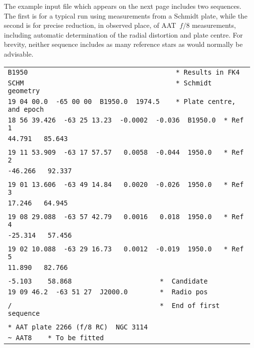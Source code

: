 The example input file which appears on the next page
includes two sequences.
The first is for a typical
run using measurements from a Schmidt plate, while the second
is for precise reduction, in observed place, of AAT~$f/8$ measurements,
including automatic determination of the radial distortion and
plate centre.
For brevity, neither sequence includes as many reference stars as
would normally be advisable.

\pagebreak
\begin{center}
\begin{small}
\begin{tabular}{|l|}
\hline
\verb|B1950                                     * Results in FK4| \\
\verb|SCHM                                      * Schmidt geometry| \\
\verb|19 04 00.0  -65 00 00  B1950.0  1974.5    * Plate centre, and epoch| \\
\verb|18 56 39.426  -63 25 13.23  -0.0002  -0.036  B1950.0  * Ref 1| \\
\verb|44.791   85.643| \\
\\
\verb|19 11 53.909  -63 17 57.57   0.0058  -0.044  1950.0   * Ref 2| \\
\verb|-46.266   92.337| \\
\\
\verb|19 01 13.606  -63 49 14.84   0.0020  -0.026  1950.0   * Ref 3| \\
\verb|17.246   64.945| \\
\\
\verb|19 08 29.088  -63 57 42.79   0.0016   0.018  1950.0   * Ref 4| \\
\verb|-25.314   57.456| \\
\\
\verb|19 02 10.088  -63 29 16.73   0.0012  -0.019  1950.0   * Ref 5| \\
\verb|11.890   82.766| \\
\\
\verb|-5.103    58.868                      *  Candidate| \\
\verb|19 09 46.2  -63 51 27  J2000.0        *  Radio pos| \\
\\
\verb|/                                     *  End of first sequence| \\
\\
\verb|* AAT plate 2266 (f/8 RC)  NGC 3114| \\
\verb|~ AAT8    * To be fitted| \\

\end{tabular}
\end{small}
\end{center}
